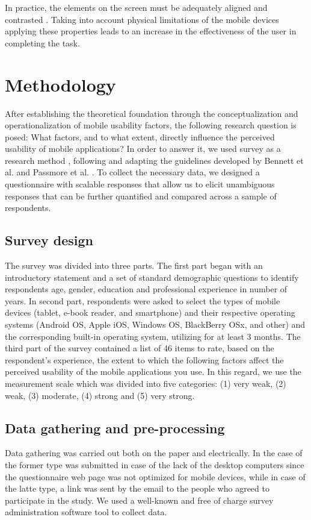 \documentclass[preprint,12pt]{elsarticle}
\begin{document}
In practice, the elements on the screen must be adequately aligned and contrasted \cite{cunha2013heuristic}. Taking into account physical limitations of the mobile devices applying these properties leads to an increase in the effectiveness of the user in completing the task.

\section{Methodology}
\label{sec:methodology}
After establishing the theoretical foundation through the conceptualization and operationalization of mobile usability factors, the following research question is posed: What factors, and to what extent, directly influence the perceived usability of mobile applications?
In order to answer it, we used survey as a research method \cite{fowler2013survey}, following and adapting the guidelines developed by Bennett et al. \cite{bennett2011reporting} and Passmore et al. \cite{passmore2002guidelines}. To collect the necessary data, we designed a questionnaire with scalable responses that allow us to elicit unambiguous responses that can be further quantified and compared across a sample of respondents.

\subsection{Survey design}
The survey was divided into three parts. 
The first part began with an introductory statement and a set of standard demographic questions to identify respondents age, gender, education and professional experience in number of years. 
In second part, respondents were asked to select the types of mobile devices (tablet, e-book reader, and smartphone) and their respective operating systems (Android OS, Apple iOS, Windows OS, BlackBerry OSx, and other) and the corresponding built-in operating system, utilizing for at least 3 months.
The third part of the survey contained a list of 46 items to rate, based on the respondent's experience, the extent to which the following factors affect the perceived usability of the mobile applications you use. In this regard, we use the measurement scale which was divided into five categories: (1) very weak, (2) weak, (3) moderate, (4) strong and (5) very strong.

\subsection{Data gathering and pre-processing}
Data gathering was carried out both on the paper and electrically.
In the case of the former type was submitted in case of the lack of the desktop computers since the questionnaire web page was not optimized for mobile devices, while in case of the latte type, a link was sent by the email to the people who agreed to participate in the study. We used a well-known and free of charge survey administration software tool to collect data.
\end{document}
